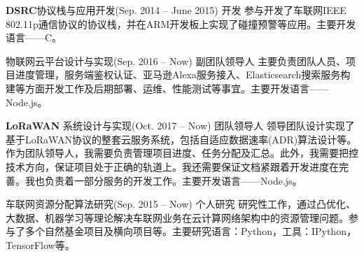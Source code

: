 \documentclass[10pt]{article} %
\begin{document}
\begin{paracol}{2}
	
	
	
	
	\chsworkposition{} %
	{} %
	{\textbf{DSRC}协议栈与应用开发(Sep. 2014 -- June 2015)} %
	{ 开发} %
	{参与开发了车联网IEEE 802.11p通信协议的协议栈，并在ARM开发板上实现了碰撞预警等应用。主要开发语言——C。}
	
	
	\chsworkposition{} %
	{} %
	{物联网云平台设计与实现(Sep. 2016 -- Now)} %
	{ 副团队领导人} %
	{主要负责团队人员、项目进度管理，服务端鉴权认证、亚马逊\faAmazon Alexa服务接入、Elasticsearch搜索服务构建等方面开发工作及后期部署、运维、性能测试等事宜。主要开发语言——Node.js。}  %
	
	\chsworkposition{} %
	{} %
	{\textbf{LoRaWAN\texttrademark} 系统设计与实现(Oct. 2017 -- Now)} %
	{ 团队领导人} %
	{领导团队设计实现了基于LoRaWAN\texttrademark 协议的整套云服务系统，包括自适应数据速率(ADR)算法设计等。作为团队领导人，我需要负责管理项目进度、任务分配及汇总。此外，我需要把控技术方向，保证项目处于正确的轨道上。我还需要保证文档紧跟着开发进度在完善。我也负责着一部分服务的开发工作。主要开发语言——Node.js。}  %
	
	\chsworkposition{} %
	{} %
	{车联网资源分配算法研究(Sep. 2015 -- Now)} %
	{ 个人研究} %
	{研究性工作，通过凸优化、大数据、机器学习等理论解决车联网业务在云计算网络架构中的资源管理问题。参与了多个自然基金项目及横向项目等。主要研究语言：Python，工具：IPython，TensorFlow等。} %
	
	
	\vspace{-\baselineskip}\medskip %
	

\end{paracol}
\end{document}
